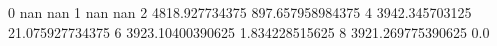 0 nan nan
1 nan nan
2 4818.927734375 897.657958984375
4 3942.345703125 21.075927734375
6 3923.10400390625 1.834228515625
8 3921.269775390625 0.0
